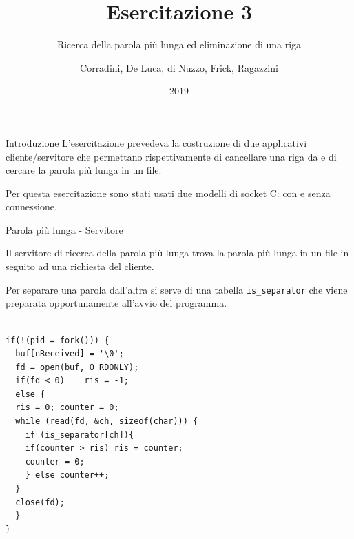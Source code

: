 \documentclass[8pt]{beamer}
\begin{document}
\title{Esercitazione 3}
\subtitle{Ricerca della parola più lunga ed eliminazione di una riga}
\author{Corradini, De Luca, di Nuzzo, Frick, Ragazzini}
\date{2019}
\begin{frame}
\titlepage
\end{frame}
\begin{frame}{Introduzione}
\LARGE
  L'esercitazione prevedeva la costruzione di due applicativi cliente/servitore che permettano rispettivamente di cancellare una riga da e di cercare la parola più lunga in un file.

  Per questa esercitazione sono stati usati due modelli di socket C: con e senza connessione.
  \normalsize
\end{frame}
\begin{frame}[fragile]{Parola più lunga - Servitore}
  
  Il servitore di ricerca della parola più lunga trova la parola più lunga in un file in seguito ad una richiesta del cliente.
  
  Per separare una parola dall'altra si serve di una tabella \texttt{is\_separator} 
  che viene preparata opportunamente all'avvio del programma.
  
  \begin{verbatim}

if(!(pid = fork())) {
  buf[nReceived] = '\0';
  fd = open(buf, O_RDONLY);
  if(fd < 0) 	ris = -1;
  else {
  ris = 0; counter = 0;
  while (read(fd, &ch, sizeof(char))) {
    if (is_separator[ch]){ 
    if(counter > ris) ris = counter;
    counter = 0;
    } else counter++;
  }
  close(fd);
  }
}
  \end{verbatim}
  \normalsize

  
\end{frame}
\end{document}
